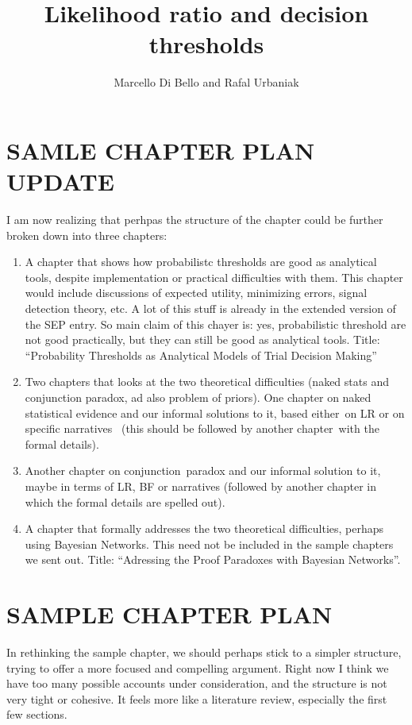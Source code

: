 \documentclass[10pt,dvipsnames,enabledeprecatedfontcommands]{scrartcl}
\title{Likelihood ratio and decision thresholds}
\author{Marcello Di Bello and Rafal Urbaniak}
\date{}
\begin{document}
\maketitle

\section*{SAMLE CHAPTER PLAN UPDATE}

I am now realizing that perhpas the structure of the chapter could be
further broken down into three chapters:

\begin{enumerate}
\def\labelenumi{\arabic{enumi}.}
\item
  A chapter that shows how probabilistc thresholds are good as
  analytical tools, despite implementation or practical difficulties
  with them. This chapter would include discussions of expected utility,
  minimizing errors, signal detection theory, etc. A lot of this stuff
  is already in the extended version of the SEP entry. So main claim of
  this chayer is: yes, probabilistic threshold are not good practically,
  but they can still be good as analytical tools. Title: ``Probability
  Thresholds as Analytical Models of Trial Decision Making''
\item
  Two chapters that looks at the two theoretical difficulties (naked
  stats and conjunction paradox, ad also problem of priors). One chapter
  on naked statistical evidence and our informal solutions to it, based
  either~on LR or on specific narratives~ (this should be followed by
  another chapter~with the formal details).
\item
  Another chapter on conjunction~paradox and our informal solution to
  it, maybe in terms of LR, BF or narratives (followed by another
  chapter in which the formal details are spelled out).
\item
  A chapter that formally addresses the two theoretical difficulties,
  perhaps using Bayesian Networks. This need not be included in the
  sample chapters we sent out. Title: ``Adressing the Proof Paradoxes
  with Bayesian Networks''.
\end{enumerate}

\section*{SAMPLE CHAPTER PLAN}

In rethinking the sample chapter, we should perhaps stick to a simpler
structure, trying to offer a more focused and compelling argument. Right
now I think we have too many possible accounts under consideration, and
the structure is not very tight or cohesive. It feels more like a
literature review, especially the first few sections.
\end{document}
